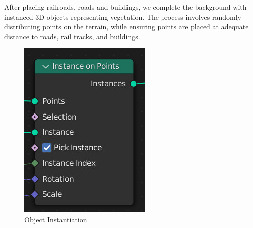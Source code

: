 After placing railroads, roads and buildings, we complete the background with instanced 3D objects representing vegetation. The process involves randomly distributing points on the terrain, while ensuring points are placed at adequate distance to roads, rail tracks, and buildings. 

\begin{figure}[!htb]
   \begin{minipage}{0.24\textwidth}
     \centering
     \includegraphics[width=.97 \linewidth]{src/img/vegetation/2-instantiation.jpg}
     \caption{Object Instantiation}
     \label{fig:veg-instantiation}
   \end{minipage}\hfill
   \begin{minipage}{0.21\textwidth}
     \centering

\end{minipage}
\end{figure}
